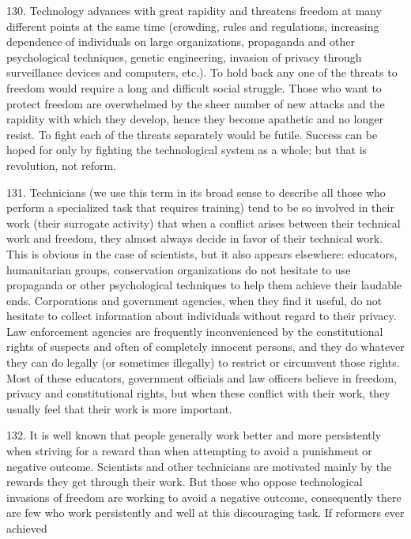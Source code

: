 \documentclass{article}
\begin{document}
130.  Technology advances with great rapidity and threatens freedom at many different points at 
the  same  time  (crowding,  rules  and  regulations,  increasing  dependence  of  individuals  on  large  
organizations,  propaganda  and  other  psychological  techniques,  genetic  engineering,  invasion  of  
privacy through surveillance devices and computers, etc.).  To hold back any one of the threats to 
freedom would require a long and difficult social struggle.  Those who want to protect freedom 
are overwhelmed by the sheer number of new attacks and the rapidity with which they develop, 
hence they become apathetic and no longer resist.  To fight each of the threats separately would 
be futile.  Success can be hoped for only by fighting the technological system as a whole; but that 
is revolution, not reform. \vspace{\baselineskip}

131.  Technicians  (we  use  this  term  in  its  broad  sense  to  describe  all  those  who  perform  a  
specialized task that requires training) tend to be so involved in their work (their surrogate activity) 
that when a conflict arises between their technical work and freedom, they almost always decide 
in  favor  of  their  technical  work.   This  is  obvious  in  the  case  of  scientists,  but  it  also  appears  
elsewhere:  educators,  humanitarian  groups,  conservation  organizations  do  not  hesitate  to  use  
propaganda or other psychological techniques to help them achieve their laudable 
ends.  Corporations and government agencies, when they find it useful, do not hesitate to collect 
information  about  individuals  without  regard  to  their  privacy.   Law  enforcement  agencies  are  
frequently inconvenienced by the constitutional rights of suspects and often of completely innocent 
persons, and they do whatever they can do legally (or sometimes illegally) to restrict or circumvent 
those rights.  Most of these educators, government officials and law officers believe in freedom, 
privacy and constitutional rights, but  when these conflict with their  work, they  usually  feel that 
their work is more important. \vspace{\baselineskip}

132.  It is well known that people generally work better and more persistently when striving for a 
reward  than  when  attempting  to  avoid  a  punishment  or  negative  outcome.   Scientists  and  other  
technicians  are  motivated  mainly  by  the  rewards  they  get  through  their  work.   But  those  who  
oppose technological invasions of freedom are working to avoid a negative outcome, consequently 
there are few who work persistently and well at this discouraging task.  If reformers ever achieved 
 
\end{document}
